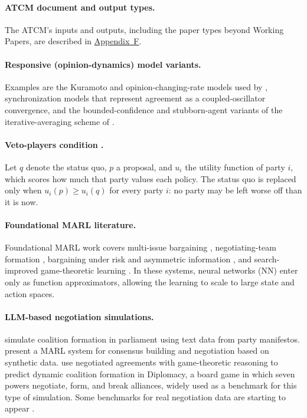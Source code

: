\paragraph{ATCM document and output types.}
The ATCM's inputs and outputs, including the paper types beyond Working Papers, are described in
\hyperref[app:f]{Appendix~F}.

\paragraph{Responsive (opinion-dynamics) model variants.}
Examples are the Kuramoto and opinion-changing-rate models used by
\textcite{Botelho_CoalitionDynamics}, synchronization models that represent agreement as a
coupled-oscillator convergence, and the bounded-confidence \parencite{Hegselmann2002} and
stubborn-agent \parencite{FriedkinJohnsen1990} variants of the iterative-averaging scheme of
\textcite{DeGroot1974}.

\paragraph{Veto-players condition \parencite{Tsebelis2002}.}
Let $q$ denote the status quo, $p$ a proposal, and $u_i$ the utility function of party $i$,
which scores how much that party values each policy. The status quo is replaced only when
$u_i(p) \geq u_i(q)$ for every party $i$: no party may be left worse off than it is now.

\paragraph{Foundational MARL literature.}
Foundational MARL work covers multi-issue bargaining \parencite{Chang2021}, negotiating-team
formation \parencite{Bachrach2020}, bargaining under risk and asymmetric information
\parencite{Schmid2020}, and search-improved game-theoretic learning \parencite{Li2023}. In these
systems, neural networks (NN) enter only as function approximators, allowing the learning to
scale to large state and action spaces.

\paragraph{LLM-based negotiation simulations.}
\textcite{Moghimifar2024} simulate coalition formation in parliament using text data from party
manifestos. \textcite{Bolleddu2025} present a MARL system for consensus building and negotiation
based on synthetic data. \textcite{Kulkarni2025} use negotiated agreements with game-theoretic
reasoning to predict dynamic coalition formation in Diplomacy, a board game in which seven powers
negotiate, form, and break alliances, widely used as a benchmark for this type of simulation.
Some benchmarks for real negotiation data are starting to appear \parencite{Benac2026}.

